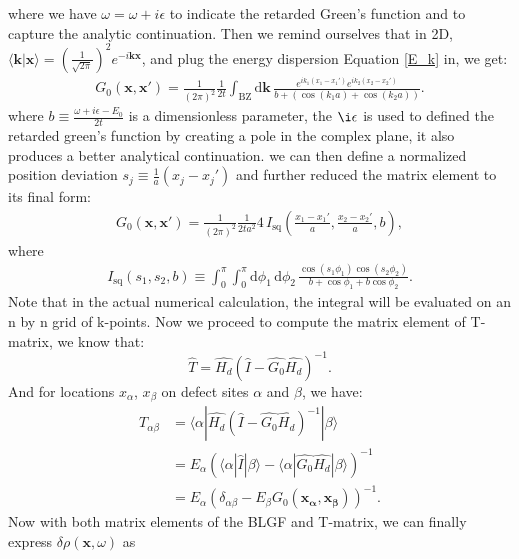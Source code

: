 where we have $\omega= \omega + i\epsilon$ to indicate the retarded Green's function and to capture the analytic continuation. Then we remind ourselves that in 2D, $\langle \mathbf{k}|\mathbf{x} \rangle = (\frac{1}{\sqrt{2\pi}})^2 e^{-i\mathbf{k}\mathbf{x}}$, and plug the energy dispersion Equation \ref{E_k} in, we get: 
\begin{align}
	G_0(\mathbf{x}, \mathbf{x}') = 
	\frac{1}{(2\pi)^2} \frac{1}{2t} 
	\int_{\text{BZ}} \mathrm{d}\mathbf{k} \, 
	\frac{e^{i k_1 (x_1 - x_1')} e^{i k_2 (x_2 - x_2')}}{b + \left( \cos(k_1 a) + \cos(k_2 a) \right)}. 
\end{align}
where $b \equiv \frac{\omega+ i\epsilon-E_0}{2t}$ is a dimensionless parameter, the $\i\epsilon$ is used to defined the retarded green's function by creating a pole in the complex plane, it also produces a better analytical continuation. we can then define a normalized position deviation $s_j \equiv \frac{1}{a}(x_j-x_j')$ and further reduced the matrix element to its final form: 
\begin{align}
	G_0(\mathbf{x}, \mathbf{x}') = 
	\frac{1}{(2\pi)^2} \frac{1}{2t a^2} 4 \, I_{\text{sq}} 
	\left( \frac{x_1 - x_1'}{a}, \frac{x_2 - x_2'}{a}, b \right) \label{blgf},
\end{align}
where
\begin{align}
	I_{\text{sq}}(s_1, s_2, b) \equiv 
	\int_0^\pi \int_0^\pi \mathrm{d}\phi_1 \, \mathrm{d}\phi_2 \, 
	\frac{\cos(s_1 \phi_1) \cos(s_2 \phi_2)}{b + \cos\phi_1 +b  \cos\phi_2} \label{Isq}.
\end{align}
Note that in the actual numerical calculation, the integral will be evaluated on an n by n grid of k-points.  
Now we proceed to compute the matrix element of T-matrix, we know that: 
\begin{equation}
	\hat{T} = \hat{H_d} (\hat{I} - \hat{G_0}\hat{H_d})^{-1}.
\end{equation} 
And for locations $x_\alpha$, $x_\beta$ on defect sites $\alpha$ and $\beta$, we have: 
\begin{align}
	T_{\alpha\beta} &= \langle \alpha|\hat{H_d} (\hat{I} - \hat{G_0}\hat{H_d})^{-1} | \beta\rangle \\
	&= E_\alpha(\langle \alpha|\hat{I}|\beta\rangle - \langle \alpha|\hat{G_0}\hat{H_d}|\beta \rangle)^{-1} \\
	&= E_\alpha(\delta_{\alpha \beta} - E_\beta G_0(\mathbf{x_\alpha},\mathbf{x_\beta}))^{-1} \label{T_matrix_ele}.
\end{align}
Now with both matrix elements of the \ac{BLGF} and T-matrix, we can finally express $\delta\rho(\mathbf{x},\omega)$ as 
